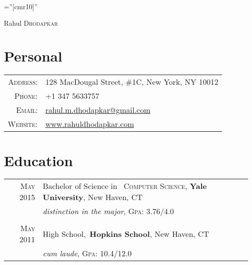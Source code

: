 \documentclass[a4paper,10pt]{article}
\begin{document}

\pagestyle{empty} %

\font\fb=''[cmr10]'' %

\par{\centering
		{\Huge Rahul \textsc{Dhodapkar}
	}\bigskip\par}

\section{Personal}

\begin{tabular}{rl}
    \textsc{Address:}   & 128 MacDougal Street, \#1C, New York, NY 10012 \\
    \textsc{Phone:}      & +1 347 5633757\\
    \textsc{Email:}       & \href{mailto:rahul.m.dhodapkar@gmail.com}{rahul.m.dhodapkar@gmail.com}\\
    \textsc{Website:}   & \href{http://www.rahuldhodapkar.com}{www.rahuldhodapkar.com}
\end{tabular}

\section{Education}
\begin{tabular}{rl}	
 \textsc{May} 2015 & Bachelor of Science in \
 \textsc{Computer Science}, \textbf{Yale University}, New Haven, CT\\
&\small\emph{distinction in the major}, \normalsize \textsc{Gpa}: 3.76/4.0\\
\\
\textsc{May} 2011 & High School,\
 \normalsize \textbf{Hopkins School}, New Haven, CT\\
&\small\emph{cum laude}, \normalsize \textsc{Gpa}: 10.4/12.0\\
\end{tabular}
\end{document}
